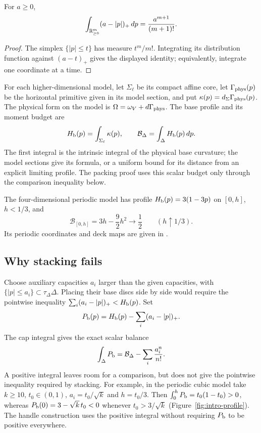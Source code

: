 \begin{lemma}\label{lem:mech-toric-volume}
For $a\ge0$,
\[
 \int_{\mathbb{R}^m_{\ge0}}(a-|p|)_+\,dp=\frac{a^{m+1}}{(m+1)!}.
\]
\end{lemma}
\begin{proof}
The simplex $\{|p|\le t\}$ has measure $t^m/m!$. Integrating its distribution function against
$(a-t)_+$ gives the displayed identity; equivalently, integrate one coordinate at a time.
\end{proof}

For each higher-dimensional model, let $\Sigma_\ell$ be its compact affine core, let
$\Gamma_{\rm phys}(p)$ be the horizontal primitive given in its model section, and put
$\kappa(p)=d_\Sigma\Gamma_{\rm phys}(p)$. The physical form on the model is
$\Omega=\omega_V+d\Gamma_{\rm phys}$. The base profile and its moment budget are
\begin{equation}\label{eq:mech-model-volume}
 H_{\mathrm b}(p)=\int_{\Sigma_\ell}\kappa(p),\qquad
 \mathcal B_\Delta=\int_\Delta H_{\mathrm b}(p)\,dp .
\end{equation}
The first integral is the intrinsic integral of the physical base curvature; the model sections give
its formula, or a uniform bound for its distance from an explicit limiting profile. The packing proof uses this
scalar budget only through the comparison inequality below.

The four-dimensional periodic model has profile $H_{\mathrm b}(p)=3(1-3p)$ on $[0,h]$, $h<1/3$, and
\[
 \mathcal B_{[0,h]}=3h-\frac92h^2\longrightarrow\frac12\qquad(h\uparrow1/3).
\]
Its periodic coordinates and deck maps are given in .

\subsection{Why stacking fails}\label{sec:mech-stacking}

Choose auxiliary capacities $a_i$ larger than the given capacities, with
$\{|p|\le a_i\}\subset\tau_\Delta\Delta$. Placing their base discs side by side would require the
pointwise inequality $\sum_i(a_i-|p|)_+<H_{\mathrm b}(p)$. Set
\[
 P_{\mathrm b}(p)=H_{\mathrm b}(p)-\sum_i(a_i-|p|)_+ .
\]
The cap integral gives the exact scalar balance
\begin{equation}\label{eq:mech-mean}
 \int_\Delta P_{\mathrm b}=\mathcal B_\Delta-\sum_i\frac{a_i^n}{n!}.
\end{equation}
A positive integral leaves room for a comparison, but does not give the pointwise inequality required by
stacking. For example, in the periodic cubic model take $k\ge10$, $t_0\in(0,1)$, $a_i=t_0/\sqrt k$ and $h=t_0/3$.
Then $\int_0^hP_{\mathrm b}=t_0(1-t_0)>0$, whereas $P_{\mathrm b}(0)=3-\sqrt k\,t_0<0$ whenever
$t_0>3/\sqrt k$ (Figure~\ref{fig:intro-profile}). The handle construction uses the positive integral
without requiring $P_{\mathrm b}$ to be positive everywhere.

